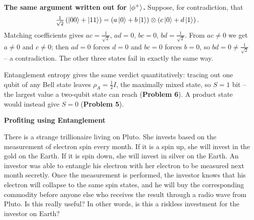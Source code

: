 \documentclass[a4paper, 10pt]{article}
\begin{document}
\begin{proofbox}
	\myspace

	\noindent \textbf{The same argument written out for \( \ket{\phi^{+}} \).} Suppose, for contradiction, that
	\[
		\tfrac{1}{\sqrt{2}}\left(\ket{00} + \ket{11}\right) = \left(a\ket{0} + b\ket{1}\right) \otimes \left(c\ket{0} + d\ket{1}\right) .
	\]
	Matching coefficients gives \( ac = \frac{1}{\sqrt{2}} \), \( ad = 0 \), \( bc = 0 \), \( bd = \frac{1}{\sqrt{2}} \).
	From \( ac \ne 0 \) we get \( a \ne 0 \) and \( c \ne 0 \); then \( ad = 0 \) forces \( d = 0 \) and \( bc = 0 \) forces \( b = 0 \),
	so \( bd = 0 \ne \frac{1}{\sqrt{2}} \) -- a contradiction.
	The other three states fail in exactly the same way.

	\begin{remark}
		Entanglement entropy gives the same verdict quantitatively: tracing out one qubit of any Bell state leaves \( \rho_A = \tfrac{1}{2}I \), the maximally mixed state, so \( S = 1 \) bit -- the largest value a two-qubit state can reach (\textbf{Problem 6}).
		A product state would instead give \( S = 0 \) (\textbf{Problem 5}).
	\end{remark}
\end{proofbox}

\begin{problem}
\textbf{Profiting using Entanglement}
\par There is a strange trillionaire living on Pluto.
She invests based on the measurement of electron spin every month.
If it is a spin up, she will invest in the gold on the Earth.
If it is spin down, she will invest in silver on the Earth.
An investor was able to entangle his electron with her electron to be measured next month secretly.
Once the measurement is performed, the investor knows that his electron will collapse to the same spin states,
and he will buy the corresponding commodity before anyone else who receives the result through a radio wave from Pluto.
Is this really useful? In other words, is this a riskless investment for the investor on Earth?
\end{problem}
\end{document}
